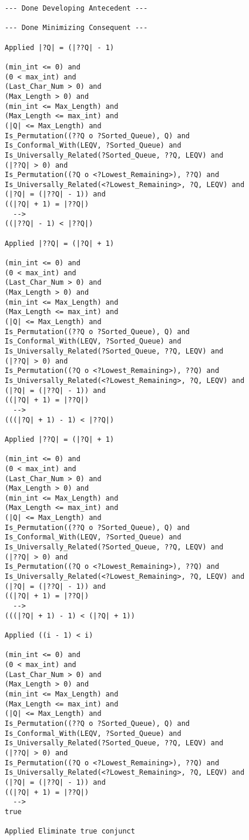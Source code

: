 \begin{lstlisting}[language=resolve]
--- Done Developing Antecedent ---

--- Done Minimizing Consequent ---

Applied |?Q| = (|??Q| - 1)

(min_int <= 0) and
(0 < max_int) and
(Last_Char_Num > 0) and
(Max_Length > 0) and
(min_int <= Max_Length) and
(Max_Length <= max_int) and
(|Q| <= Max_Length) and
Is_Permutation((??Q o ?Sorted_Queue), Q) and
Is_Conformal_With(LEQV, ?Sorted_Queue) and
Is_Universally_Related(?Sorted_Queue, ??Q, LEQV) and
(|??Q| > 0) and
Is_Permutation((?Q o <?Lowest_Remaining>), ??Q) and
Is_Universally_Related(<?Lowest_Remaining>, ?Q, LEQV) and
(|?Q| = (|??Q| - 1)) and
((|?Q| + 1) = |??Q|)
  -->
((|??Q| - 1) < |??Q|)

Applied |??Q| = (|?Q| + 1)

(min_int <= 0) and
(0 < max_int) and
(Last_Char_Num > 0) and
(Max_Length > 0) and
(min_int <= Max_Length) and
(Max_Length <= max_int) and
(|Q| <= Max_Length) and
Is_Permutation((??Q o ?Sorted_Queue), Q) and
Is_Conformal_With(LEQV, ?Sorted_Queue) and
Is_Universally_Related(?Sorted_Queue, ??Q, LEQV) and
(|??Q| > 0) and
Is_Permutation((?Q o <?Lowest_Remaining>), ??Q) and
Is_Universally_Related(<?Lowest_Remaining>, ?Q, LEQV) and
(|?Q| = (|??Q| - 1)) and
((|?Q| + 1) = |??Q|)
  -->
(((|?Q| + 1) - 1) < |??Q|)

Applied |??Q| = (|?Q| + 1)

(min_int <= 0) and
(0 < max_int) and
(Last_Char_Num > 0) and
(Max_Length > 0) and
(min_int <= Max_Length) and
(Max_Length <= max_int) and
(|Q| <= Max_Length) and
Is_Permutation((??Q o ?Sorted_Queue), Q) and
Is_Conformal_With(LEQV, ?Sorted_Queue) and
Is_Universally_Related(?Sorted_Queue, ??Q, LEQV) and
(|??Q| > 0) and
Is_Permutation((?Q o <?Lowest_Remaining>), ??Q) and
Is_Universally_Related(<?Lowest_Remaining>, ?Q, LEQV) and
(|?Q| = (|??Q| - 1)) and
((|?Q| + 1) = |??Q|)
  -->
(((|?Q| + 1) - 1) < (|?Q| + 1))

Applied ((i - 1) < i)

(min_int <= 0) and
(0 < max_int) and
(Last_Char_Num > 0) and
(Max_Length > 0) and
(min_int <= Max_Length) and
(Max_Length <= max_int) and
(|Q| <= Max_Length) and
Is_Permutation((??Q o ?Sorted_Queue), Q) and
Is_Conformal_With(LEQV, ?Sorted_Queue) and
Is_Universally_Related(?Sorted_Queue, ??Q, LEQV) and
(|??Q| > 0) and
Is_Permutation((?Q o <?Lowest_Remaining>), ??Q) and
Is_Universally_Related(<?Lowest_Remaining>, ?Q, LEQV) and
(|?Q| = (|??Q| - 1)) and
((|?Q| + 1) = |??Q|)
  -->
true

Applied Eliminate true conjunct


\end{lstlisting}
